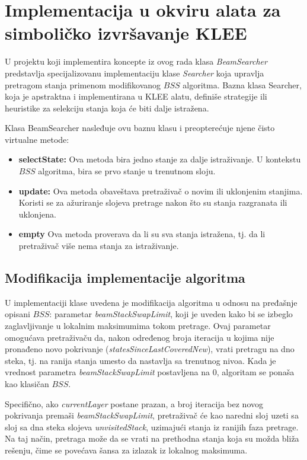 \documentclass[a4paper]{article}
\begin{document}
\section{Implementacija u okviru alata za simboličko izvršavanje KLEE}

U projektu koji implementira koncepte iz ovog rada \cite{Projekat} klasa \emph{BeamSearcher} predstavlja specijalizovanu implementaciju klase \emph{Searcher} koja upravlja pretragom stanja primenom modifikovanog
$BSS$ algoritma. Bazna klasa Searcher, koja je apstraktna i implementirana u KLEE alatu,
definiše strategije ili heuristike za selekciju stanja koja će biti dalje istražena.

Klasa BeamSearcher nasleđuje ovu baznu klasu i preopterećuje njene čisto virtualne metode:
\begin{itemize}
    \item \textbf{selectState:} Ova metoda bira jedno stanje za dalje istraživanje. U kontekstu $BSS$ algoritma, bira se prvo stanje u trenutnom sloju.

    \item \textbf{update:} Ova metoda obaveštava pretraživač o novim ili uklonjenim stanjima. Koristi se za ažuriranje slojeva pretrage nakon što su stanja razgranata ili uklonjena.

    \item \textbf{empty} Ova metoda proverava da li su sva stanja istražena, tj. da li pretraživač više nema stanja za istraživanje.
\end{itemize}

\subsection{Modifikacija implementacije algoritma}

U implementaciji klase uvedena je modifikacija algoritma u odnosu na pređašnje opisani $BSS$: parametar \emph{beamStackSwapLimit}, koji je uveden kako bi se izbeglo zaglavljivanje u lokalnim maksimumima tokom pretrage. Ovaj parametar omogućava pretraživaču da, nakon određenog broja iteracija u kojima nije pronađeno novo pokrivanje (\emph{statesSinceLastCoveredNew}), vrati pretragu na dno steka, tj. na ranija stanja umesto da nastavlja sa trenutnog nivoa. Kada je vrednost parametra \emph{beamStackSwapLimit} postavljena na 0, algoritam se ponaša kao klasičan $BSS$.

Specifično, ako \emph{currentLayer} postane prazan, a broj iteracija bez novog pokrivanja premaši \emph{beamStackSwapLimit}, pretraživač će kao naredni sloj uzeti sa sloj sa dna steka slojeva \emph{unvisitedStack}, uzimajući stanja iz ranijih faza pretrage. Na taj način, pretraga može da se vrati na prethodna stanja koja su možda bliža rešenju, čime se povećava šansa za izlazak iz lokalnog maksimuma.
\end{document}
